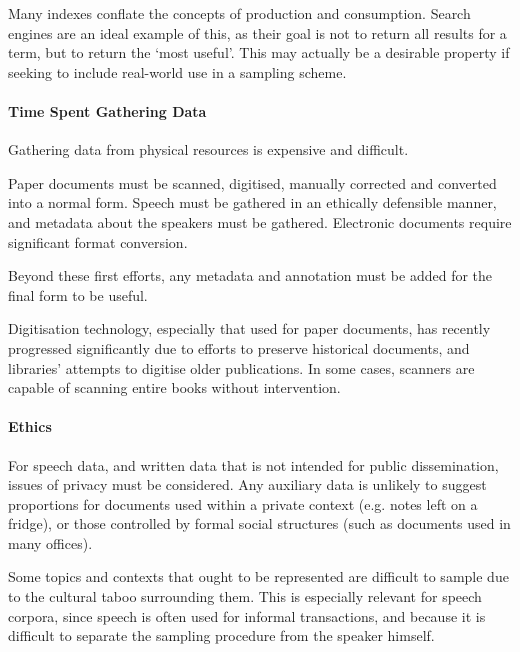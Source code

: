 Many indexes conflate the concepts of production and consumption.  Search engines are an ideal example of this, as their goal is not to return all results for a term, but to return the `most useful'.  This may actually be a desirable property if seeking to include real-world use in a sampling scheme.




\paragraph{Time Spent Gathering Data}
Gathering data from physical resources is expensive and difficult.  

Paper documents must be scanned, digitised, manually corrected and converted into a normal form. Speech must be gathered in an ethically defensible manner, and metadata about the speakers must be gathered.  Electronic documents require significant format conversion.

Beyond these first efforts, any metadata and annotation must be added for the final form to be useful.

Digitisation technology, especially that used for paper documents, has recently progressed significantly due to efforts to preserve historical documents, and libraries' attempts to digitise older publications. In some cases, scanners are capable of scanning entire books without intervention.




\paragraph{Ethics}
For speech data, and written data that is not intended for public dissemination, issues of privacy must be considered.  Any auxiliary data is unlikely to suggest proportions for documents used within a private context (e.g. notes left on a fridge), or those controlled by formal social structures (such as documents used in many offices).

Some topics and contexts that ought to be represented are difficult to sample due to the cultural taboo surrounding them. This is especially relevant for speech corpora, since speech is often used for informal transactions, and because it is difficult to separate the sampling procedure from the speaker himself.



